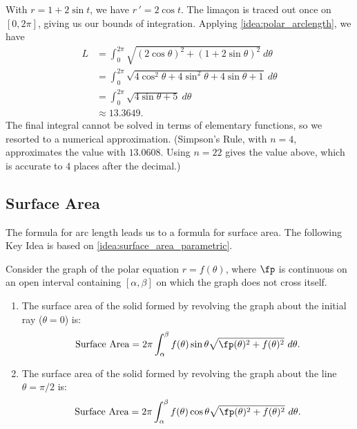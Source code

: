 {With $r=1+2\sin t$, we have $r\,' = 2\cos t$. The lima\c con is traced out once on $[0,2\pi]$, giving us our bounds of integration. Applying \autoref{idea:polar_arclength}, we have
\begin{align*}
	L
	&= \int_0^{2\pi} \sqrt{(2\cos\theta)^2+(1+2\sin\theta)^2}\ d\theta \\
	&=	\int_0^{2\pi} \sqrt{4\cos^2\theta+4\sin^2\theta +4\sin\theta+1}\ d\theta\\
	&=	\int_0^{2\pi} \sqrt{4\sin\theta+5}\ d\theta\\
	&\approx 13.3649.
\end{align*}
The final integral cannot be solved in terms of elementary functions, so we resorted to a numerical approximation. (Simpson's Rule, with $n=4$, approximates the value with $13.0608$. Using $n=22$ gives the value above, which is accurate to 4 places after the decimal.)}

\subsection*{Surface Area}

The formula for arc length leads us to a formula for surface area. The following Key Idea is based on \autoref{idea:surface_area_parametric}.

{Consider the graph of the polar equation $r=f(\theta)$, where $\fp$ is continuous on an open interval containing $[\alpha,\beta]$ on which the graph does not cross itself.
\begin{enumerate}
	\item The surface area of the solid formed by revolving the graph about the initial ray ($\theta=0$) is:
	$$\text{Surface Area} = 2\pi\int_\alpha^\beta f(\theta)\sin\theta\sqrt{\fp(\theta)^2+f(\theta)^2}\ d\theta.$$
	\item The surface area of the solid formed by revolving the graph about the line $\theta=\pi/2$ is:
	$$\text{Surface Area} = 2\pi\int_\alpha^\beta f(\theta)\cos\theta\sqrt{\fp(\theta)^2+f(\theta)^2}\ d\theta.$$
\end{enumerate}}

